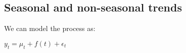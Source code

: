 
\subsection{Seasonal and non-seasonal trends}

We can model the process as:

\(y_t=\mu_t +f(t)+\epsilon_t \)

